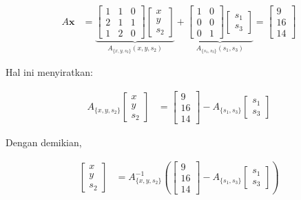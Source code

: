 \bigskip

\begin{align*}
A\mathbf{x}
&=
\underbrace{
\begin{bmatrix}
1 & 1 & 0 \\
2 & 1 & 1 \\
1 & 2 & 0
\end{bmatrix}
\begin{bmatrix}
x \\ y \\ s_2
\end{bmatrix}
}_{A_{\{x, y, s_2\}} (x, y, s_2)}
+
\underbrace{
\begin{bmatrix}
1 & 0 \\
0 & 0 \\
0 & 1
\end{bmatrix}
\begin{bmatrix}
s_1 \\ s_3
\end{bmatrix}
}_{A_{\{s_1, s_3\}} (s_1, s_3)}
=
\begin{bmatrix}
9 \\ 16 \\ 14
\end{bmatrix}
\end{align*}

\bigskip

Hal ini menyiratkan:

\begin{align*}
A_{\{x, y, s_2\}} 
\begin{bmatrix}
x \\ y \\ s_2
\end{bmatrix}
&=
\begin{bmatrix}
9 \\ 16 \\ 14
\end{bmatrix}
-
A_{\{s_1, s_3\}}
\begin{bmatrix}
s_1 \\ s_3
\end{bmatrix}
\end{align*}

\bigskip

Dengan demikian,

\begin{align*}
\begin{bmatrix}
x \\ y \\ s_2
\end{bmatrix}
&=
A_{\{x, y, s_2\}}^{-1}
\left(
\begin{bmatrix}
9 \\ 16 \\ 14
\end{bmatrix}
-
A_{\{s_1, s_3\}}
\begin{bmatrix}
s_1 \\ s_3
\end{bmatrix}
\right)
\end{align*}

